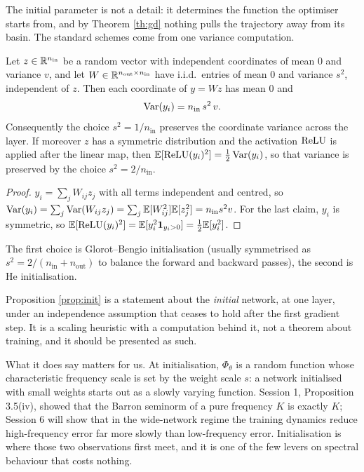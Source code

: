 \documentclass[11pt,a4paper]{article}
\begin{document}
The initial parameter is not a detail: it determines the function the optimiser starts from, and by
Theorem \ref{th:gd} nothing pulls the trajectory away from its basin. The standard schemes come from
one variance computation.

\begin{proposition}\label{prop:init}
Let $z \in \mathbb{R}^{n_{\mathrm{in}}}$ be a random vector with independent coordinates of mean $0$ and
variance $v$, and let $W \in \mathbb{R}^{n_{\mathrm{out}} \times n_{\mathrm{in}}}$ have i.i.d.\ entries of
mean $0$ and variance $s^2$, independent of $z$. Then each coordinate of $y = Wz$ has mean $0$ and
\[
\operatorname{Var}(y_i) = n_{\mathrm{in}}\, s^2\, v .
\]
Consequently the choice $s^2 = 1/n_{\mathrm{in}}$ preserves the coordinate variance across the
layer. If moreover $z$ has a symmetric distribution and the activation $\operatorname{ReLU}$ is applied after the
linear map, then $\mathbb{E}[\operatorname{ReLU}(y_i)^2] = \tfrac12\operatorname{Var}(y_i)$, so that variance is preserved by the choice
$s^2 = 2/n_{\mathrm{in}}$.
\end{proposition}

\begin{proof}
$y_i = \sum_j W_{ij}z_j$ with all terms independent and centred, so
$\operatorname{Var}(y_i) = \sum_j \operatorname{Var}(W_{ij}z_j) = \sum_j \mathbb{E}[W_{ij}^2]\mathbb{E}[z_j^2] = n_{\mathrm{in}}s^2v$. For the
last claim, $y_i$ is symmetric, so $\mathbb{E}[\operatorname{ReLU}(y_i)^2] = \mathbb{E}[y_i^2\mathbf{1}_{y_i>0}] = \tfrac12\mathbb{E}[y_i^2]$.
\end{proof}

The first choice is Glorot--Bengio initialisation (usually symmetrised as
$s^2 = 2/(n_{\mathrm{in}} + n_{\mathrm{out}})$ to balance the forward and backward passes), the
second is He initialisation.

\begin{remark}
Proposition \ref{prop:init} is a statement about the \emph{initial} network, at one layer, under an
independence assumption that ceases to hold after the first gradient step. It is a scaling heuristic
with a computation behind it, not a theorem about training, and it should be presented as such.

What it does say matters for us. At initialisation, $\Phi_\theta$ is a random function whose
characteristic frequency scale is set by the weight scale $s$: a network initialised with small
weights starts out as a slowly varying function. Session 1, Proposition 3.5(iv), showed that the
Barron seminorm of a pure frequency $K$ is exactly $K$; Session 6 will show that in the wide-network
regime the training dynamics reduce high-frequency error far more slowly than low-frequency error.
Initialisation is where those two observations first meet, and it is one of the few levers on
spectral behaviour that costs nothing.
\end{remark}
\end{document}
